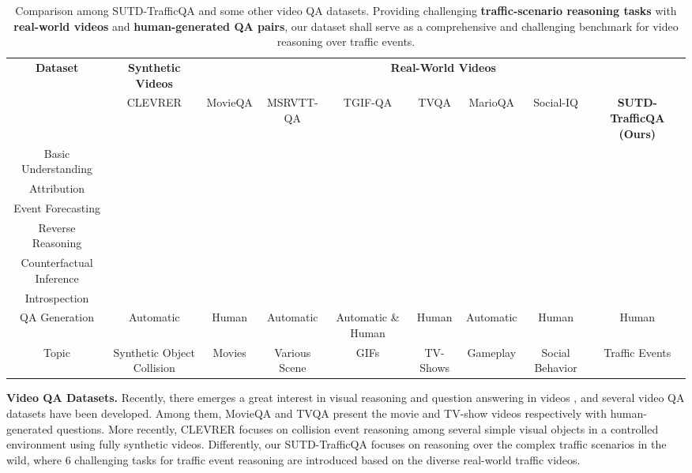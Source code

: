\documentclass[final]{cvpr}
\begin{document}
\begin{table*}[t]
\caption{Comparison among SUTD-TrafficQA and some other video QA datasets. Providing challenging \textbf{traffic-scenario reasoning tasks} with \textbf{real-world videos} and \textbf{human-generated QA pairs}, our dataset shall serve as a comprehensive and challenging benchmark for video reasoning over traffic events.}
\vspace{-0.2cm}
\begin{center}
\scriptsize
\setlength\tabcolsep{0.5pt}
\begin{tabular}{c|c|ccccccc} \hline
\multirow{2}{*}{\textbf{Dataset}} & \textbf{Synthetic Videos} & \multicolumn{7}{c}{\textbf{Real-World Videos}} \\
\cline{2-9}
& CLEVRER \cite{yi2019clevrer} 
        & MovieQA \cite{tapaswi2016movieqa} & MSRVTT-QA \cite{xu2017video} & TGIF-QA \cite{jang2017tgif} & TVQA \cite{lei2018tvqa} &  MarioQA \cite{mun2017marioQA} & Social-IQ \cite{zadeh2019social} &  \textbf{SUTD-TrafficQA (Ours)} \\ \hline
Basic Understanding  &  &  &  &  &  &  &  & \textbf{} \\ 
Attribution  &  &  &  &  &  &  &  & \textbf{} \\
Event Forecasting &  &     &  &      &      &      &      & \textbf{}  \\ 
Reverse Reasoning  &      &      &  &      &      &      &      & \textbf{} \\ 
Counterfactual Inference &  &     &  &      &      &      &      & \textbf{} \\ 
Introspection   &      &     & &       &      &      &      & \textbf{} \\
\hline
QA Generation & Automatic & Human & Automatic & Automatic \& Human & Human & Automatic & Human & Human \\ \hline
Topic & Synthetic Object Collision & Movies & Various Scene & GIFs & TV-Shows & Gameplay & Social Behavior & Traffic Events\\ \hline
\end{tabular}
\end{center}
\label{table:dataset_comparison}
\vspace{-0.5cm}
\end{table*}

\textbf{Video QA Datasets.}
Recently, there emerges a great interest in visual reasoning and question answering in videos \cite{10.1007/s11263-016-0987-1,maharaj2017dataset,zhu2017uncovering,ijcai2017-280}, and several video QA datasets \cite{xu2017video,zeng2016leveraging,tapaswi2016movieqa,zadeh2019social,jang2017tgif,garcia2020knowit,emrvqasongMM18,yu2019activityqa} have been developed. Among them, 
MovieQA \cite{tapaswi2016movieqa} and TVQA \cite{lei2018tvqa} present the movie and TV-show videos respectively with human-generated questions. More recently, 
CLEVRER \cite{yi2019clevrer} focuses on collision event reasoning among several simple visual objects
in a controlled environment using fully synthetic videos. Differently, our SUTD-TrafficQA focuses on reasoning over the complex traffic scenarios in the wild, where 6 challenging tasks for traffic event reasoning are introduced based on the diverse real-world
traffic
videos.  
\end{document}
